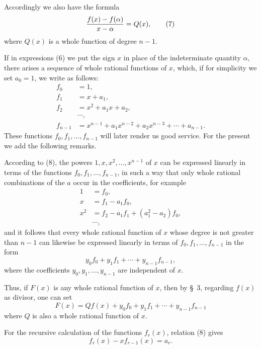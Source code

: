 
Accordingly we also have the formula
\begin{equation}
 {f(x)-f(\alpha)\over x-\alpha}=Q(x),
\tag{7}
\end{equation}
where $Q(x)$ is a whole function of degree $n-1$.

If in expressions (6) we put the sign $x$ in place of the indeterminate
quantity $\alpha$, there arises a sequence of whole rational functions
of $x$, which, if for simplicity we set $a_0=1$, we write as follows:
\begin{equation}
\begin{aligned}
 f_0&=1,\\
 f_1&=x+a_1,\\
 f_2&=x^2+a_1x+a_2,\\
 &\cdots,\\
 f_{n-1}&=x^{n-1}+a_1x^{n-2}+a_2x^{n-3}+\cdots+a_{n-1}.
\end{aligned}
\tag{8}
\end{equation}
These functions $f_0,f_1,\ldots,f_{n-1}$ will later render us good
service. For the present we add the following remarks.

According to (8), the powers $1,x,x^2,\ldots,x^{n-1}$ of $x$ can be
expressed linearly in terms of the functions
$f_0,f_1,\ldots,f_{n-1}$, in such a way that only whole rational
combinations of the $a$ occur in the coefficients, for example
\[
\begin{aligned}
 1&=f_0,\\
 x&=f_1-a_1f_0,\\
 x^2&=f_2-a_1f_1+(a_1^2-a_2)f_0,\\
 &\cdots,
\end{aligned}
\]
and it follows that every whole rational function of $x$ whose degree
is not greater than $n-1$ can likewise be expressed linearly in terms
of $f_0,f_1,\ldots,f_{n-1}$ in the form
\begin{equation}
 y_0f_0+y_1f_1+\cdots+y_{n-1}f_{n-1},
\tag{9}
\end{equation}
where the coefficients $y_0,y_1,\ldots,y_{n-1}$ are independent of
$x$.

Thus, if $F(x)$ is any whole rational function of $x$, then by \S~3,
regarding $f(x)$ as divisor, one can set
\begin{equation}
 F(x)=Qf(x)+y_0f_0+y_1f_1+\cdots+y_{n-1}f_{n-1}
\tag{10}
\end{equation}
where $Q$ is also a whole rational function of $x$.

For the recursive calculation of the functions $f_r(x)$, relation (8)
gives
\begin{equation}
 f_r(x)-xf_{r-1}(x)=a_r.
\tag{11}
\end{equation}
